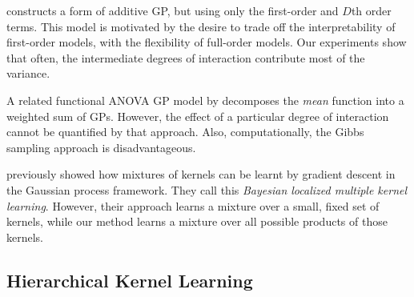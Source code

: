 \cite{plate1999accuracy} constructs a form of additive GP, but using only the first-order and $D$th order terms.  This model is motivated by the desire to trade off the interpretability of first-order models, with the flexibility of full-order models.  Our experiments show that often, the intermediate degrees of interaction contribute most of the variance.

A related functional ANOVA GP model by \cite{kaufman2010bayesian} decomposes the \emph{mean} function into a weighted sum of GPs. However, the effect of a particular degree of interaction cannot be quantified by that approach. Also, computationally, the Gibbs sampling approach is disadvantageous.


\cite{christoudias2009bayesian} previously showed how mixtures of kernels can be learnt by gradient descent in the Gaussian process framework.  They call this \emph{Bayesian localized multiple kernel learning}.
However, their approach learns a mixture over a small, fixed set of kernels, while our method learns a mixture over all possible products of those kernels.

\subsection{Hierarchical Kernel Learning}

